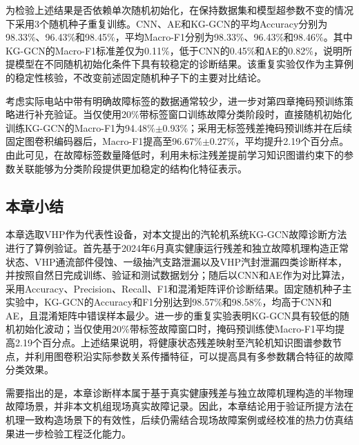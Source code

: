 为检验上述结果是否依赖单次随机初始化，在保持数据集和模型超参数不变的情况下采用3个随机种子重复训练。CNN、AE和KG-GCN的平均Accuracy分别为98.33\%、96.43\%和98.45\%，平均Macro-F1分别为98.33\%、96.43\%和98.46\%。其中KG-GCN的Macro-F1标准差仅为0.11\%，低于CNN的0.45\%和AE的0.82\%，说明所提模型在不同随机初始化条件下具有较稳定的诊断结果。该重复实验仅作为主算例的稳定性核验，不改变前述固定随机种子下的主要对比结论。

考虑实际电站中带有明确故障标签的数据通常较少，进一步对第四章掩码预训练策略进行补充验证。当仅使用20\%带标签窗口训练故障分类阶段时，直接随机初始化训练KG-GCN的Macro-F1为94.48\%$\pm$0.93\%；采用无标签残差掩码预训练并在后续固定图卷积编码器后，Macro-F1提高至96.67\%$\pm$0.27\%，平均提升2.19个百分点。由此可见，在故障标签数量降低时，利用未标注残差提前学习知识图谱约束下的参数关联能够为分类阶段提供更加稳定的结构化特征表示。

\subsection{本章小结}

本章选取VHP作为代表性设备，对本文提出的汽轮机系统KG-GCN故障诊断方法进行了算例验证。首先基于2024年6月真实健康运行残差和独立故障机理构造正常状态、VHP通流部件侵蚀、一级抽汽支路泄漏以及VHP汽封泄漏四类诊断样本，并按照自然日完成训练、验证和测试数据划分；随后以CNN和AE作为对比算法，采用Accuracy、Precision、Recall、F1和混淆矩阵评价诊断结果。固定随机种子主实验中，KG-GCN的Accuracy和F1分别达到98.57\%和98.58\%，均高于CNN和AE，且混淆矩阵中错误样本最少。进一步的重复实验表明KG-GCN具有较低的随机初始化波动；当仅使用20\%带标签故障窗口时，掩码预训练使Macro-F1平均提高2.19个百分点。上述结果说明，将健康状态残差映射至汽轮机知识图谱参数节点，并利用图卷积沿实际参数关系传播特征，可以提高具有多参数耦合特征的故障分类效果。

需要指出的是，本章诊断样本属于基于真实健康残差与独立故障机理构造的半物理故障场景，并非本文机组现场真实故障记录。因此，本章结论用于验证所提方法在机理一致构造场景下的有效性，后续仍需结合现场故障案例或经校准的热力仿真结果进一步检验工程泛化能力。